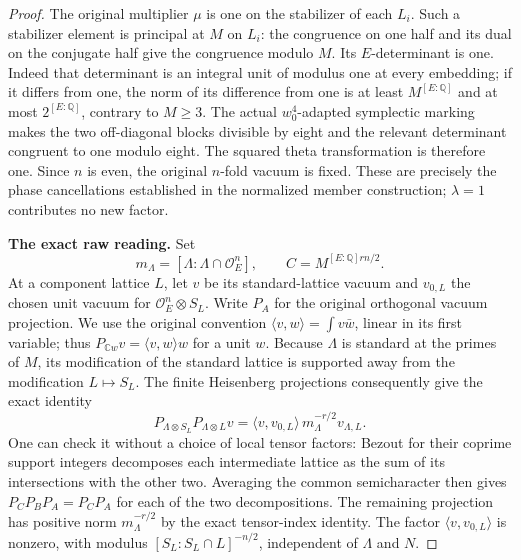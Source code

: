 \begin{proof}
The original multiplier $\mu$ is one on the stabilizer of each
$L_i$. Such a stabilizer element is principal at $M$ on $L_i$:
the congruence on one half and its dual on the conjugate half
give the congruence modulo $M$. Its $E$-determinant is one.
Indeed that determinant is an integral unit of modulus one at
every embedding; if it differs from one, the norm of its
difference from one is at least $M^{[E:\mathbb Q]}$ and at
most $2^{[E:\mathbb Q]}$, contrary to $M\ge3$.
The actual $w_0^4$-adapted symplectic marking makes the two
off-diagonal blocks divisible by eight and the relevant
determinant congruent to one modulo eight. The squared theta
transformation is therefore one. Since $n$ is even, the
original $n$-fold vacuum is fixed. These are precisely the
phase cancellations established in the normalized member
construction; $\lambda=1$ contributes no new factor.

\textbf{The exact raw reading.}
Set
\[
 m_\Lambda=[\Lambda:\Lambda\cap\mathcal O_E^n],\qquad
 C=M^{[E:\mathbb Q]rn/2}.
\]
At a component lattice $L$, let $v$ be its standard-lattice
vacuum and $v_{0,L}$ the chosen unit vacuum for
$\mathcal O_E^n\otimes S_L$. Write $P_A$ for the original
orthogonal vacuum projection. We use the original convention
$\langle v,w\rangle=\int v\bar w$, linear in its first
variable; thus $P_{\mathbb Cw}v=\langle v,w\rangle w$
for a unit $w$. Because $\Lambda$ is standard
at the primes of $M$, its modification of the standard lattice
is supported away from the modification $L\mapsto S_L$.
The finite Heisenberg projections consequently give the exact
identity
\begin{equation}\label{raw-span-projection}
 P_{\Lambda\otimes S_L}P_{\Lambda\otimes L}v
   =\langle v,v_{0,L}\rangle\,
       m_\Lambda^{-r/2}v_{\Lambda,L}.
\end{equation}
One can check it without a choice of local tensor factors:
Bezout for their coprime support integers decomposes each
intermediate lattice as the sum of its intersections with the
other two. Averaging the common semicharacter then gives
$P_CP_BP_A=P_CP_A$ for each of the two decompositions.
The remaining projection has positive norm $m_\Lambda^{-r/2}$
by the exact tensor-index identity. The factor
$\langle v,v_{0,L}\rangle$ is nonzero, with modulus
$[S_L:S_L\cap L]^{-n/2}$, independent of $\Lambda$ and $N$.


\end{proof}
